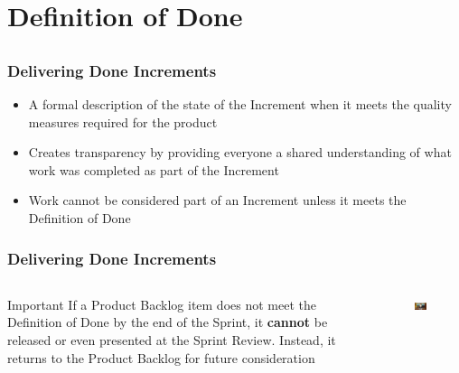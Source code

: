 \section{Definition of Done}
\subsection{}

\begin{frame}
	\frametitle{Delivering Done Increments}
	\begin{itemize}
		\setlength\itemsep{0.7em}
		\item A formal description of the state of the Increment when it meets the quality measures required for the product
		\item Creates transparency by providing everyone a shared understanding of what work was completed as part of the Increment
		      \item<2-> Work cannot be considered part of an Increment unless it meets the Definition of Done
	\end{itemize}
\end{frame}

\begin{frame}
	\frametitle{Delivering Done Increments}
	\begin{columns}
		\begin{column}{0.5\textwidth}
			\begin{alertblock}{Important}
				If a Product Backlog item does not meet the Definition of Done by the end of the Sprint, it \textbf{cannot} be released or even presented at the Sprint Review. Instead, it returns to the Product Backlog for future consideration
			\end{alertblock}
		\end{column}
		\begin{column}{0.5\textwidth}
			\vspace{-1em}
			\begin{figure}
				\includegraphics[width=2.7in]{images/itsdone.jpg}
			\end{figure}
		\end{column}
	\end{columns}
\end{frame}

